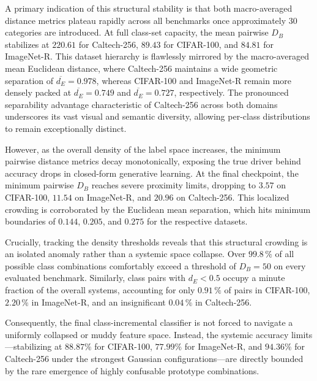 A primary indication of this structural stability is that both macro-averaged distance metrics plateau rapidly across all benchmarks once approximately 30 categories are introduced. At full class-set capacity, the mean pairwise $D_B$ stabilizes at $220.61$ for Caltech-256, $89.43$ for CIFAR-100, and $84.81$ for ImageNet-R. This dataset hierarchy is flawlessly mirrored by the macro-averaged mean Euclidean distance, where Caltech-256 maintains a wide geometric separation of $\overline{d_E} = 0.978$, whereas CIFAR-100 and ImageNet-R remain more densely packed at $\overline{d_E} = 0.749$ and $\overline{d_E} = 0.727$, respectively. The pronounced separability advantage characteristic of Caltech-256 across both domains underscores its vast visual and semantic diversity, allowing per-class distributions to remain exceptionally distinct.

However, as the overall density of the label space increases, the minimum pairwise distance metrics decay monotonically, exposing the true driver behind accuracy drops in closed-form generative learning. At the final checkpoint, the minimum pairwise $D_B$ reaches severe proximity limits, dropping to $3.57$ on CIFAR-100, $11.54$ on ImageNet-R, and $20.96$ on Caltech-256. This localized crowding is corroborated by the Euclidean mean separation, which hits minimum boundaries of $0.144$, $0.205$, and $0.275$ for the respective datasets. 

Crucially, tracking the density thresholds reveals that this structural crowding is an isolated anomaly rather than a systemic space collapse. Over $99.8\,\%$ of all possible class combinations comfortably exceed a threshold of $D_B = 50$ on every evaluated benchmark. Similarly, class pairs with $d_E < 0.5$ occupy a minute fraction of the overall systems, accounting for only $0.91\,\%$ of pairs in CIFAR-100, $2.20\,\%$ in ImageNet-R, and an insignificant $0.04\,\%$ in Caltech-256. 

Consequently, the final class-incremental classifier is not forced to navigate a uniformly collapsed or muddy feature space. Instead, the systemic accuracy limits—stabilizing at $88.87\%$ for CIFAR-100, $77.99\%$ for ImageNet-R, and $94.36\%$ for Caltech-256 under the strongest Gaussian configurations—are directly bounded by the rare emergence of highly confusable prototype combinations. 

